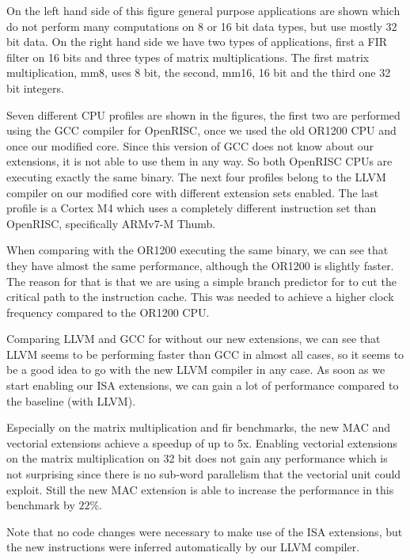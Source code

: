 On the left hand side of this figure general purpose applications are shown
which do not perform many computations on 8 or 16 bit data types, but use mostly
32 bit data. On the right hand side we have two types of applications, first a
\gls{FIR} filter on 16 bits and three types of matrix multiplications. The first
matrix multiplication, mm8, uses 8 bit, the second, mm16, 16 bit and the third
one 32 bit integers.

Seven different \gls{CPU} profiles are shown in the figures, the first two are
performed using the GCC compiler for OpenRISC, once we used the old OR1200
\gls{CPU} and once our modified \orion core. Since this version of GCC does not
know about our extensions, it is not able to use them in any way. So both
OpenRISC \glspl{CPU} are executing exactly the same binary.
The next four profiles belong to the LLVM compiler on our modified \orion core
with different extension sets enabled.
The last profile is a Cortex M4 which uses a completely different instruction
set than OpenRISC, specifically ARMv7-M Thumb.

When comparing \orion with the OR1200 executing the same binary, we can see that
they have almost the same performance, although the OR1200 is slightly faster.
The reason for that is that we are using a simple branch predictor for \orion to
cut the critical path to the instruction cache. This was needed to achieve a
higher clock frequency compared to the OR1200 \gls{CPU}.

Comparing LLVM and GCC for \orion without our new extensions, we can see that
LLVM seems to be performing faster than GCC in almost all cases, so it seems to
be a good idea to go with the new LLVM compiler in any case. As soon as we start
enabling our \gls{ISA} extensions, we can gain a lot of performance compared to
the baseline (\orion with LLVM).

Especially on the matrix multiplication and fir benchmarks, the new MAC and
vectorial extensions achieve a speedup of up to 5x. Enabling vectorial
extensions on the matrix multiplication on 32 bit does not gain any performance
which is not surprising since there is no sub-word parallelism that the
vectorial unit could exploit. Still the new MAC extension is able to increase
the performance in this benchmark by $22\%$.



Note that no code changes were necessary to make use of the \gls{ISA}
extensions, but the new instructions were inferred automatically by our LLVM
compiler.


